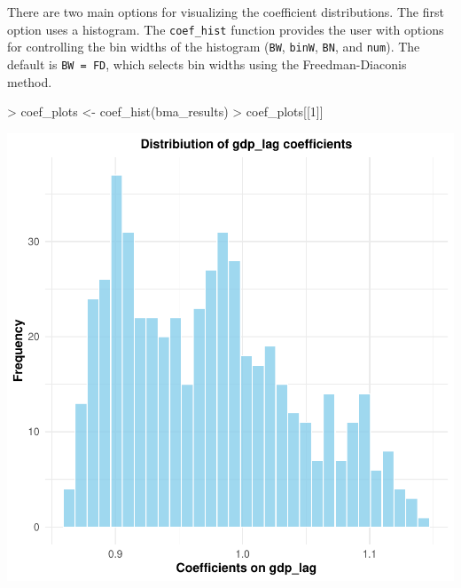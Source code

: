 \documentclass[a4paper]{article}
\begin{document}
There are two main options for visualizing the coefficient distributions.
The first option uses a histogram.
The \verb+coef_hist+ function provides the user with options for controlling the bin widths of the histogram (\verb+BW+, \verb+binW+, \verb+BN+, and \verb+num+).
The default is \verb+BW = FD+, which selects bin widths using the Freedman-Diaconis method.
\begin{Schunk}
\begin{Sinput}
> coef_plots <- coef_hist(bma_results)
> coef_plots[[1]]
\end{Sinput}
\end{Schunk}
\includegraphics{bdsm_vignette-023}
\end{document}
